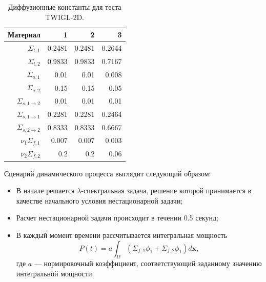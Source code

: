 \documentclass{crm-article}
\begin{document}
\begin{table}[ht]
\caption{\label{table:coeff}Диффузионные константы для теста TWIGL-2D.}
\label{t1}
\begin{center}
\begin{tabular}{rrrr}
\hline
Материал & 1 & 2 & 3\\
\hline 
$\Sigma_{t,1}$ 				& 0.2481 & 0.2481 & 0.2644 \\
$\Sigma_{t,2}$ 				& 0.9833 & 0.9833 & 0.7167 \\
$\Sigma_{a,1}$ 				& 0.01   & 0.01   & 0.008  \\
$\Sigma_{a,2}$ 				& 0.15   & 0.15   & 0.05   \\
$\Sigma_{s,1\rightarrow2}$ 	& 0.01   & 0.01   & 0.01   \\
$\Sigma_{s,1\rightarrow1}$ 	& 0.2281 & 0.2281 & 0.2464 \\
$\Sigma_{s,2\rightarrow2}$ 	& 0.8333 & 0.8333 & 0.6667 \\
$\nu_1\Sigma_{f,1}$ 		& 0.007  & 0.007  & 0.003  \\
$\nu_2\Sigma_{f,2}$ 		& 0.2    & 0.2    & 0.06   \\
\hline
\end{tabular}
\end{center}
\end{table}

Сценарий динамического процесса выглядит следующий образом:
\begin{itemize}\itemsep1pt \parskip0pt 
\item В начале решается $\lambda$-спектральная задача, решение которой принимается в качестве начального условия нестационарной задачи;
\item Расчет нестационарной задачи происходит в течении 0.5 секунд;
\item В каждый момент времени рассчитывается интегральная мощность
\begin{equation}\label{13}
P(t) = a\int_{\Omega}(\Sigma_{f,1} \phi_1 + \Sigma_{f,2} \phi_1) d\bm x,
\end{equation}
где $a$ --- нормировочный коэффициент, соответствующий заданному значению интегральной мощности.
\end{itemize}
\end{document}
